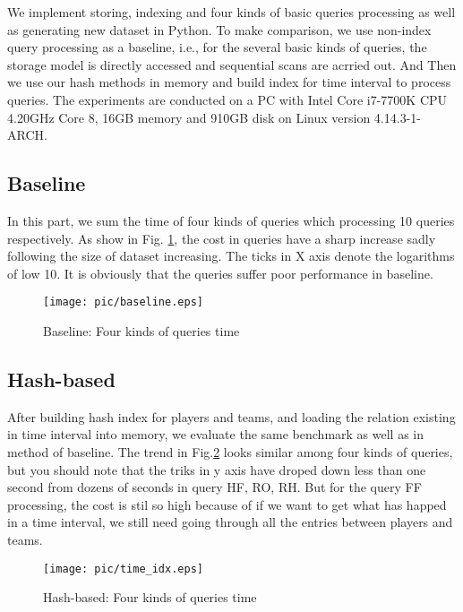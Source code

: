 We implement storing, indexing and four kinds of basic queries processing as well as generating new dataset in Python.
To make comparison, we use non-index query processing as a baseline, i.e., for the several basic kinds of queries, the 
storage model is directly accessed and sequential scans are acrried out. And Then we use our hash methods in  memory 
and build index for time interval to process queries. The experiments are conducted on a PC with Intel Core i7-7700K 
CPU 4.20GHz Core 8, 16GB memory and 910GB disk on Linux version 4.14.3-1-ARCH.

\subsection{Baseline}
In this part, we sum the time of four kinds of queries which processing 10 queries respectively. As show in Fig.
\ref{baseline}, the cost in queries have a sharp increase sadly following the size of dataset increasing. The 
ticks in X axis denote the logarithms of low 10. It is obviously that the queries suffer poor performance in 
baseline.

\begin{figure}[H]
	\centering
	\texttt{[image: pic/baseline.eps]}\\
	\caption{Baseline: Four kinds of queries time}
	\label{baseline}
\end{figure}

\subsection{Hash-based}
After building hash index for players and teams, and loading the relation existing in time interval into memory, 
we evaluate the same benchmark as well as in method of baseline. The trend in Fig.\ref{time} looks similar among four 
kinds of queries, but you should note that the triks in y axis have droped down less than one second from dozens of 
seconds in query HF, RO, RH. But for the query FF processing, the cost is stil so high because of if we want to get 
what has happed in a time interval, we still need going through all the entries between players and teams.

\begin{figure}[H]
	\centering
	\texttt{[image: pic/time\_idx.eps]}\\
	\caption{Hash-based: Four kinds of queries time}
	\label{time}
\end{figure}

